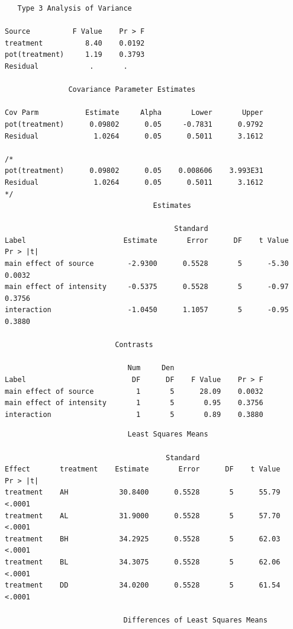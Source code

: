\begin{LARGE}
\begin{small}
\begin{verbatim}
   Type 3 Analysis of Variance
 
Source          F Value    Pr > F
treatment          8.40    0.0192
pot(treatment)     1.19    0.3793
Residual            .       .    

               Covariance Parameter Estimates
 
Cov Parm           Estimate     Alpha       Lower       Upper
pot(treatment)      0.09802      0.05     -0.7831      0.9792
Residual             1.0264      0.05      0.5011      3.1612

/*
pot(treatment)      0.09802      0.05    0.008606    3.993E31
Residual             1.0264      0.05      0.5011      3.1612
*/
                                   Estimates
 
                                        Standard
Label                       Estimate       Error      DF    t Value    Pr > |t|
main effect of source        -2.9300      0.5528       5      -5.30      0.0032
main effect of intensity     -0.5375      0.5528       5      -0.97      0.3756
interaction                  -1.0450      1.1057       5      -0.95      0.3880

                          Contrasts
 
                             Num     Den
Label                         DF      DF    F Value    Pr > F
main effect of source          1       5      28.09    0.0032
main effect of intensity       1       5       0.95    0.3756
interaction                    1       5       0.89    0.3880
\end{verbatim}
\end{small}
\newpage
{}
\begin{small}
\begin{verbatim}
                             Least Squares Means
 
                                      Standard
Effect       treatment    Estimate       Error      DF    t Value    Pr > |t|
treatment    AH            30.8400      0.5528       5      55.79      <.0001
treatment    AL            31.9000      0.5528       5      57.70      <.0001
treatment    BH            34.2925      0.5528       5      62.03      <.0001
treatment    BL            34.3075      0.5528       5      62.06      <.0001
treatment    DD            34.0200      0.5528       5      61.54      <.0001

                            Differences of Least Squares Means
 

\end{verbatim}
\end{small}
\end{LARGE}
